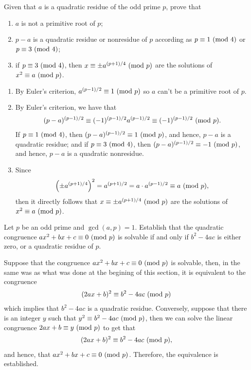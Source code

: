 \begin{exercise}
    Given that $a$ is a quadratic residue of the odd prime $p$, prove that
    \begin{enumerate}
        \item $a$ is not a primitive root of $p$;
        \item $p-a$ is a quadratic residue or nonresidue of $p$ according as $p \equiv 1 \ (\mathrm{mod}\ 4)$ or $p \equiv 3 \ (\mathrm{mod}\ 4)$;
        \item if $p \equiv 3 \ (\mathrm{mod}\ 4)$, then $x \equiv \pm a^{(p+1)/4} \ (\mathrm{mod}\ p)$ are the solutions of $x^2 \equiv a \ (\mathrm{mod}\ p)$. \\
    \end{enumerate}
\end{exercise}

\begin{solution}
    \begin{enumerate}
        \item By Euler's criterion, $a^{(p-1)/2} \equiv 1 \ (\mathrm{mod}\ p)$ so $a$ can't be a primitive root of $p$.
        \item By Euler's criterion, we have that
        $$(p-a)^{(p-1)/2} \equiv (-1)^{(p-1)/2}a^{(p-1)/2} \equiv (-1)^{(p-1)/2} \ (\mathrm{mod}\ p).$$
        If $p \equiv 1 \ (\mathrm{mod}\ 4)$, then $(p-a)^{(p-1)/2} \equiv 1 \ (\mathrm{mod}\ p)$, and hence, $p-a$ is a quadratic residue; and if $p \equiv 3 \ (\mathrm{mod}\ 4)$, then $(p-a)^{(p-1)/2} \equiv -1 \ (\mathrm{mod}\ p)$, and hence, $p-a$ is a quadratic nonresidue.
        \item Since
        $$\left(\pm a^{(p+1)/4}\right)^2 = a^{(p+1)/2} = a \cdot a^{(p-1)/2} \equiv a \ (\mathrm{mod}\ p),$$
        then it directly follows that $x \equiv \pm a^{(p+1)/4} \ (\mathrm{mod}\ p)$ are the solutions of $x^2 \equiv a \ (\mathrm{mod}\ p)$. \\
    \end{enumerate}
\end{solution}

\begin{exercise}
    Let $p$ be an odd prime and $\gcd(a,p) = 1$. Establish that the quadratic congruence $ax^2 + bx + c \equiv 0 \ (\mathrm{mod}\ p)$ is solvable if and only if $b^2 - 4ac$ is either zero, or a quadratic residue of $p$. \\
\end{exercise}

\begin{solution}
    Suppose that the congruence $ax^2 + bx + c \equiv 0 \ (\mathrm{mod}\ p)$ is solvable, then, in the same was as what was done at the begining of this section, it is equivalent to the congruence
    $$(2ax + b)^2 \equiv b^2 - 4ac \ (\mathrm{mod}\ p)$$
    which implies that $b^2 - 4ac$ is a quadratic residue. Conversely, suppose that there is an integer $y$ such that $y^2 \equiv b^2 - 4ac \ (\mathrm{mod}\ p)$, then we can solve the linear congruence $2ax + b \equiv y \ (\mathrm{mod}\ p)$ to get that
    $$(2ax + b)^2 \equiv b^2 - 4ac \ (\mathrm{mod}\ p),$$
    and hence, that $ax^2 + bx + c \equiv 0 \ (\mathrm{mod}\ p)$. Therefore, the equivalence is established. \\
\end{solution}

